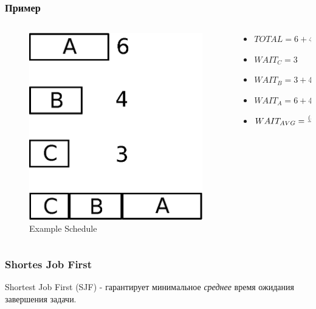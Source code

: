 \begin{frame}
\frametitle{Пример}

\begin{columns}[T]
  \begin{column}{.4\textwidth}
    \begin{figure}
      \centering\includegraphics[width=.9\linewidth]{sched1}
      \caption{Example Schedule}
    \end{figure}
  \end{column}
  \begin{column}{.6\textwidth}
    \begin{itemize}
      \item<2-> $TOTAL = 6 + 4 + 3 = 13$
      \item<3-> $WAIT_C = 3$
      \item<3-> $WAIT_B = 3 + 4 = 7$
      \item<3-> $WAIT_A = 6 + 4 + 3 = 13$
      \item<4-> $WAIT_{AVG} = {\left(3 + 7 + 13\right)\over 3} = 7.\left(6\right)$
    \end{itemize}
  \end{column}
\end{columns}
\end{frame}

\begin{frame}
\frametitle{Shortes Job First}

Shortest Job First (SJF) - гарантирует минимальное \emph{среднее} время ожидания завершения задачи.

\end{frame}

